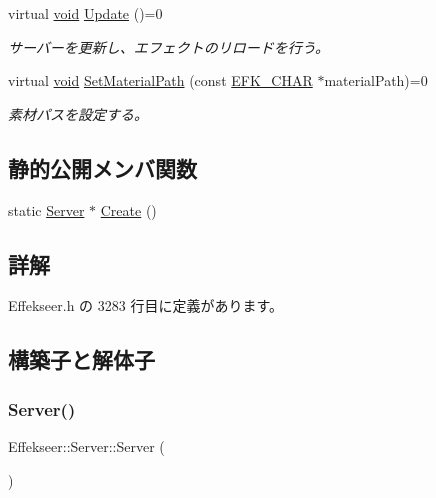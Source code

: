 \begin{DoxyCompactItemize}
virtual \mbox{\hyperlink{namespace_effekseer_ab34c4088e512200cf4c2716f168deb56}{void}} \mbox{\hyperlink{class_effekseer_1_1_server_af841f04fb41ed36b888cb2f89c4c0771}{Update}} ()=0
\begin{DoxyCompactList}\small\item\em サーバーを更新し、エフェクトのリロードを行う。 \end{DoxyCompactList}\item 
virtual \mbox{\hyperlink{namespace_effekseer_ab34c4088e512200cf4c2716f168deb56}{void}} \mbox{\hyperlink{class_effekseer_1_1_server_a4c0d31a5fd39184615179157a6929296}{Set\+Material\+Path}} (const \mbox{\hyperlink{_effekseer_8h_a50b026abea014b47854bcd835b3b6233}{E\+F\+K\+\_\+\+C\+H\+AR}} $\ast$material\+Path)=0
\begin{DoxyCompactList}\small\item\em 素材パスを設定する。 \end{DoxyCompactList}\end{DoxyCompactItemize}
\subsection*{静的公開メンバ関数}
\begin{DoxyCompactItemize}
\item 
static \mbox{\hyperlink{class_effekseer_1_1_server}{Server}} $\ast$ \mbox{\hyperlink{class_effekseer_1_1_server_a010be3e29a3551b3f2bf058b593c3eb0}{Create}} ()
\end{DoxyCompactItemize}


\subsection{詳解}


 Effekseer.\+h の 3283 行目に定義があります。



\subsection{構築子と解体子}
\mbox{\label{class_effekseer_1_1_server_af6f7a1893fb9dfe2d65a9288698e3f5a}} 
\subsubsection{\texorpdfstring{Server()}{Server()}}
{\footnotesize\ttfamily Effekseer\+::\+Server\+::\+Server (\begin{DoxyParamCaption}{ }\end{DoxyParamCaption})\hspace{0.3cm}{\ttfamily [inline]}}



